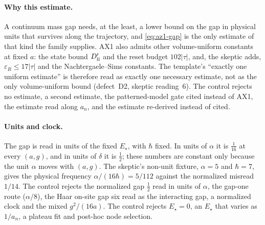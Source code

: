 \paragraph{Why this estimate.}
A continuum mass gap needs, at the least, a lower bound on the gap in physical
units that survives along the trajectory, and \eqref{eq:az1-gap} is the only
estimate of that kind the family supplies. AX1 also admits other
volume-uniform constants at fixed $a$: the state bound $D'_{\rm ii}$ and the
reset budget $102|\tau|$, and, the skeptic adds, $\varepsilon_R\le17|\tau|$
and the Nachtergaele--Sims constants. The template's ``exactly one uniform
estimate'' is therefore read as exactly one necessary estimate, not as the
only volume-uniform bound (defect~D2, skeptic reading~6). The control
 rejects no estimate, a second
estimate, the patterned-model gate cited instead of AX1, the estimate read
along $a_n$, and the estimate re-derived instead of cited.

\paragraph{Units and clock.}
The gap is read in units of the fixed $E_\star$, with $\hbar$ fixed. In units
of $\alpha$ it is $\tfrac1{16}$ at every $(a,g)$, and in units of $\delta$ it
is $\tfrac12$; these numbers are constant only because the unit $\alpha$
moves with $(a,g)$. The skeptic's non-unit fixture, $\alpha=5$ and $\hbar=7$,
gives the physical frequency $\alpha/(16\hbar)=5/112$ against the normalized
misread $1/14$. The control  rejects the
normalized gap $\tfrac12$ read in units of $\alpha$, the gap-one route
($\alpha/8$), the Haar on-site gap six read as the interacting gap, a
normalized clock and the mixed $g^2/(16a)$. The control
 rejects $E_\star=0$, an $E_\star$ that
varies as $1/a_n$, a plateau fit and post-hoc node selection.

